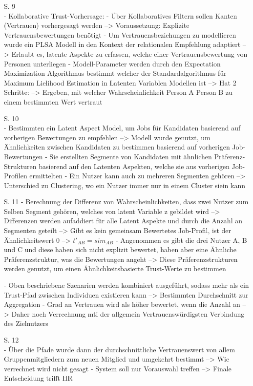 S. 9\\
- Kollaborative Trust-Vorhersage:
- Über Kollaboratives Filtern sollen Kanten (Vertrauen) vorhergesagt werden --> Voraussetzung: Explizite Vertrauensbewertungen benötigt
- Um Vertrauensbeziehungen zu modellieren wurde ein PLSA Modell in den Kontext der relationalen Empfehlung adaptiert --> Erlaubt es, latente Aspekte zu erfassen, welche einer Vertrauensbewertung von Personen unterliegen
- Modell-Parameter werden durch den Expectation Maximization Algorithmus bestimmt welcher der Standardalgorithmus für Maximum Lielihood Estimation in Latenten Variablen Modellen ist --> Hat 2 Schritte: --> Ergeben, mit welcher Wahrscheinlichkeit Person A Person B zu einem bestimmten Wert vertraut

S. 10\\
- Bestimmten ein Latent Aspect Model, um Jobs für Kandidaten basierend auf vorherigen Bewertungen zu empfehlen --> Modell wurde genutzt, um Ähnlichkeiten zwischen Kandidaten zu bestimmen basierend auf vorherigen Job-Bewertungen
- Sie erstellten Segmente von Kandidaten mit ähnlichen Präferenz-Strukturen basierend auf den Latenten Aspekten, welche sie aus vorherigen Job-Profilen ermittelten
- Ein Nutzer kann auch zu mehreren Segmenten gehören --> Unterschied zu Clustering, wo ein Nutzer immer nur in einem Cluster siein kann

S. 11
- Berechnung der Differenz von Wahrscheinlichkeiten, dass zwei Nutzer zum Selben Segment gehören, welches von latent Variable z gebildet wird --> Differenzen werden aufaddiert für alle Latent Aspekte und durch die Anzahl an Segmenten geteilt --> Gibt es kein gemeinsam Bewertetes Job-Profil, ist der Ähnlichkeitswert 0 --> $t'_{AB}=sim_{AB}$
- Angenommen es gibt die drei Nutzer A, B und C und diese haben sich nicht explizit bewertet, haben aber eine Ähnliche Präferenzstruktur, was die Bewertungen angeht --> Diese Präferenzstrukturen werden genutzt, um einen Ähnlichkeitsbasierte Trust-Werte zu bestimmen

- Oben beschriebene Szenarien werden kombiniert ausgeführt, sodass mehr als ein Trust-Pfad zwischen Individuen existieren kann --> Bestimmten Durchschnitt zur Aggregation
- Grad an Vertrauen wird als höher bewertet, wenn die Anzahl an --> Daher noch Verrechnung mti der allgemein Vertrauenswürdigsten Verbindung des Zielnutzers

S. 12\\
- Über die Pfade wurde dann der durchschnittliche Vertrauenswert von allem Gruppenmitgliedern zum neuen Mitglied und umgekehrt bestimmt --> Wie verrechnet wird nicht gesagt
- System soll nur Vorauswahl treffen --> Finale Entscheidung trifft HR


